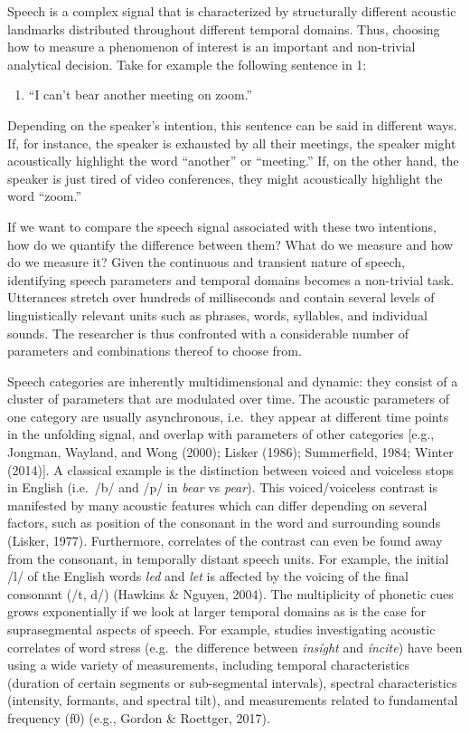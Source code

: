 \documentclass[
  english,
  man,floatsintext]{apa6}
\providecommand{\tightlist}{%
  \setlength{\itemsep}{0pt}\setlength{\parskip}{0pt}}
\begin{document}
Speech is a complex signal that is characterized by structurally different acoustic landmarks distributed throughout different temporal domains.
Thus, choosing how to measure a phenomenon of interest is an important and non-trivial analytical decision. Take for example the following sentence in 1:

\begin{enumerate}
\def\labelenumi{(\arabic{enumi})}
\tightlist
\item
  ``I can't bear another meeting on zoom.''
\end{enumerate}

Depending on the speaker's intention, this sentence can be said in different ways.
If, for instance, the speaker is exhausted by all their meetings, the speaker might acoustically highlight the word ``another'' or ``meeting.''
If, on the other hand, the speaker is just tired of video conferences, they might acoustically highlight the word ``zoom.''

If we want to compare the speech signal associated with these two intentions, how do we quantify the difference between them? What do we measure and how do we measure it?
Given the continuous and transient nature of speech, identifying speech parameters and temporal domains becomes a non-trivial task.
Utterances stretch over hundreds of milliseconds and contain several levels of linguistically relevant units such as phrases, words, syllables, and individual sounds.
The researcher is thus confronted with a considerable number of parameters and combinations thereof to choose from.

Speech categories are inherently multidimensional and dynamic: they consist of a cluster of parameters that are modulated over time.
The acoustic parameters of one category are usually asynchronous, i.e.~they appear at different time points in the unfolding signal, and overlap with parameters of other categories {[}e.g., Jongman, Wayland, and Wong (2000); Lisker (1986); Summerfield, 1984; Winter (2014){]}.
A classical example is the distinction between voiced and voiceless stops in English (i.e.~/b/ and /p/ in \emph{bear} vs \emph{pear}).
This voiced/voiceless contrast is manifested by many acoustic features which can differ depending on several factors, such as position of the consonant in the word and surrounding sounds (Lisker, 1977).
Furthermore, correlates of the contrast can even be found away from the consonant, in temporally distant speech units.
For example, the initial /l/ of the English words \emph{led} and \emph{let} is affected by the voicing of the final consonant (/t, d/) (Hawkins \& Nguyen, 2004).
The multiplicity of phonetic cues grows exponentially if we look at larger temporal domains as is the case for suprasegmental aspects of speech.
For example, studies investigating acoustic correlates of word stress (e.g.~the difference between \emph{insíght} and \emph{íncite}) have been using a wide variety of measurements, including temporal characteristics (duration of certain segments or sub-segmental intervals), spectral characteristics (intensity, formants, and spectral tilt), and measurements related to fundamental frequency (f0) (e.g., Gordon \& Roettger, 2017).
\end{document}
